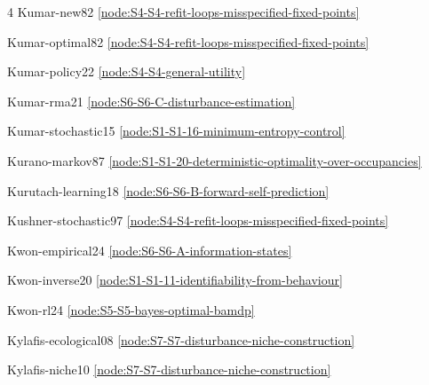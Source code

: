 \documentclass[10pt]{article}
\begin{document}
{\begin{multicols}{4}
Kumar-new82 \hfill \ref{node:S4-S4-refit-loops-misspecified-fixed-points}\par
Kumar-optimal82 \hfill \ref{node:S4-S4-refit-loops-misspecified-fixed-points}\par
Kumar-policy22 \hfill \ref{node:S4-S4-general-utility}\par
Kumar-rma21 \hfill \ref{node:S6-S6-C-disturbance-estimation}\par
Kumar-stochastic15 \hfill \ref{node:S1-S1-16-minimum-entropy-control}\par
Kurano-markov87 \hfill \ref{node:S1-S1-20-deterministic-optimality-over-occupancies}\par
Kurutach-learning18 \hfill \ref{node:S6-S6-B-forward-self-prediction}\par
Kushner-stochastic97 \hfill \ref{node:S4-S4-refit-loops-misspecified-fixed-points}\par
Kwon-empirical24 \hfill \ref{node:S6-S6-A-information-states}\par
Kwon-inverse20 \hfill \ref{node:S1-S1-11-identifiability-from-behaviour}\par
Kwon-rl24 \hfill \ref{node:S5-S5-bayes-optimal-bamdp}\par
Kylafis-ecological08 \hfill \ref{node:S7-S7-disturbance-niche-construction}\par
Kylafis-niche10 \hfill \ref{node:S7-S7-disturbance-niche-construction}\par


\end{multicols}}
\end{document}

